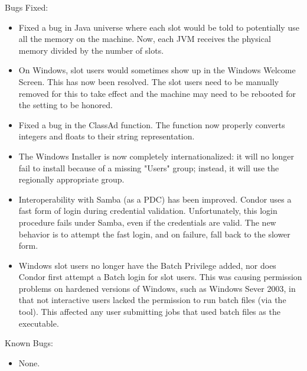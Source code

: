 \noindent Bugs Fixed:

\begin{itemize}

\item Fixed a bug in Java universe where each slot would be told to
  potentially use all the memory on the machine.  Now, each JVM 
  receives the physical memory divided by the number of slots.

\item On Windows, slot users would sometimes show up in the Windows Welcome
  Screen.  This has now been resolved.
  The slot users need to be manually
  removed for this to take effect and the machine may need to be rebooted for
  the setting to be honored.

\item Fixed a bug in the ClassAd  function.
  The function now properly converts integers and floats
  to their string representation.

\item The Windows Installer is now completely internationalized: it will no 
  longer fail to install because of a missing "Users" group; instead, it
  will use the regionally appropriate group.

\item Interoperability with Samba (as a PDC) has been improved.  Condor 
  uses a fast form of login during credential validation.  Unfortunately, 
  this login procedure fails under Samba, even if the credentials are 
  valid.  The new behavior is to attempt the fast login, and on failure, 
  fall back to the slower form.

\item Windows slot users no longer have the Batch Privilege added, nor 
  does Condor first attempt a Batch login for slot users.  This was 
  causing permission problems on hardened versions of Windows, such 
  as Windows Sever 2003, in that not interactive users lacked the 
  permission to run batch files (via the  tool). This affected 
  any user submitting jobs that used batch files as the executable.

\end{itemize}

\noindent Known Bugs:

\begin{itemize}

\item None.

\end{itemize}

